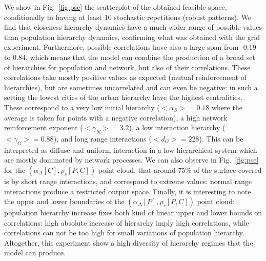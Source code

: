 \documentclass[11pt]{article}
\begin{document}
We show in Fig.~\ref{fig:pse} the scatterplot of the obtained feasible space, conditionally to having at least 10 stochastic repetitions (robust patterns). We find that closeness hierarchy dynamics have a much wider range of possible values than population hierarchy dynamics, confirming what was obtained with the grid experiment. Furthermore, possible correlations have also a large span from -0.19 to 0.84, which means that the model can combine the production of a broad set of hierarchies for population and network, but also of their correlations. These correlations take mostly positive values as expected (mutual reinforcement of hierarchies), but are sometimes uncorrelated and can even be negative: in such a setting the lowest cities of the urban hierarchy have the highest centralities. These correspond to a very low initial hierarchy ($<\alpha_S>=0.18$ where the average is taken for points with a negative correlation), a high network reinforcement exponent ($<\gamma_N>=3.2$), a low interaction hierarchy ($<\gamma_G>=0.88$), and long range interactions ($<d_G>=228$). This can be interpreted as diffuse and uniform interaction in a low-hierarchical system which are mostly dominated by network processes. We can also observe in Fig.~\ref{fig:pse} for the $(\alpha_{\Delta}\left[C\right],\rho_r\left[P,C\right])$ point cloud, that around 75\% of the surface covered is by short range interactions, and correspond to extreme values: normal range interactions produce a restricted output space. Finally, it is interesting to note the upper and lower boundaries of the $(\alpha_{\Delta}\left[P\right],\rho_r\left[P,C\right])$ point cloud: population hierarchy increase fixes both kind of linear upper and lower bounds on correlations: high absolute increase of hierarchy imply high correlations, while correlations can not be too high for small variations of population hierarchy. Altogether, this experiment show a high diversity of hierarchy regimes that the model can produce.


\end{document}
